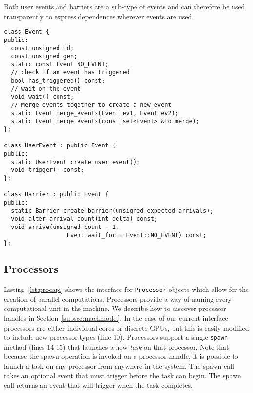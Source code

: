Both user events and barriers are a sub-type of events and can therefore
be used transparently to express dependences wherever events are used.


\begin{lstlisting}[float={t},label={lst:eventapi},caption={Event Interface.}]
class Event {
public:
  const unsigned id;
  const unsigned gen;
  static const Event NO_EVENT;
  // check if an event has triggered
  bool has_triggered() const;
  // wait on the event
  void wait() const;
  // Merge events together to create a new event
  static Event merge_events(Event ev1, Event ev2);
  static Event merge_events(const set<Event> &to_merge);
};

class UserEvent : public Event {
public:
  static UserEvent create_user_event();
  void trigger() const;
};

class Barrier : public Event {
public:
  static Barrier create_barrier(unsigned expected_arrivals);
  void alter_arrival_count(int delta) const;
  void arrive(unsigned count = 1,
                  Event wait_for = Event::NO_EVENT) const;
};
\end{lstlisting}

\subsection{Processors}
\label{subsec:procs}
Listing~\ref{lst:procapi} shows the interface for {\tt Processor} objects which allow for
the creation of parallel computations.  Processors provide a way of naming 
every computational unit in the machine.  We describe how to discover processor handles
in Section~\ref{subsec:machmodel}.  In the case of our current interface 
processors are either individual cores or discrete GPUs, but this is easily modified 
to include new processor types (line 10).   Processors support a single {\tt spawn}
method (lines 14-15) that launches a new {\em task} on that processor.
Note that because the spawn operation
is invoked on a processor handle, it is possible to launch a task on any
processor from anywhere in the system.  
The spawn call takes an optional event that must trigger before the task can begin.  
The spawn call returns an event that will trigger when the task completes.

